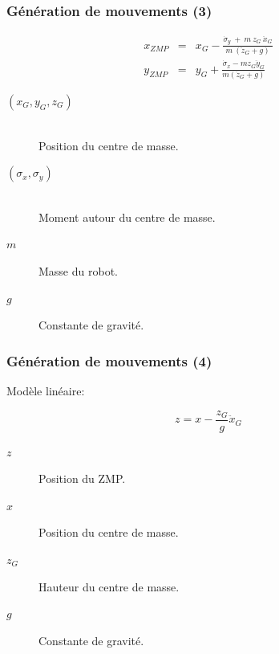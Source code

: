 \documentclass[14pt,utf8x,hyperref={pdfpagelabels=false}]{beamer}
\begin{document}
\begin{slideDecision}
  \frametitle{Génération de mouvements (3)}
  \begin{changeleftmargin}{1.1cm}
  \begin{center}
    \begin{equation*}
    \begin{array}{lll}
    x_{ZMP} &=& x_G -
    \frac{\dot{\sigma}_y\ +\ m\ z_G\ \ddot{x}_G}{m\ (\ddot{z}_G + g)}\\
    y_{ZMP} &=& y_G +
    \frac{\dot{\sigma}_x - m z_G \ddot{y}_G}{m (\ddot{z}_G + g)}
    \end{array}
  \end{equation*}

  \end{center}

  \begin{description}
    \item[$(x_G, y_G, z_G)$]~\\
      Position du centre de masse.
    \item[$(\sigma_x, \sigma_y)$]~\\
      Moment autour du centre de masse.
    \item[$m$] Masse du robot.
    \item[$g$] Constante de gravité.
  \end{description}

  \end{changeleftmargin}
\end{slideDecision}

\begin{slideDecision}
  \frametitle{Génération de mouvements (4)}
  \begin{changeleftmargin}{1.1cm}
  \begin{center}

    Modèle linéaire:

    \begin{equation*}
      z = x - \frac{z_G}{g} \ddot{x}_G
    \end{equation*}

    \begin{description}
    \item[$z$] Position du ZMP.
    \item[$x$] Position du centre de masse.
    \item[$z_G$] Hauteur du centre de masse.
    \item[$g$] Constante de gravité.
    \end{description}
  \end{center}
  \end{changeleftmargin}
\end{slideDecision}
\end{document}
